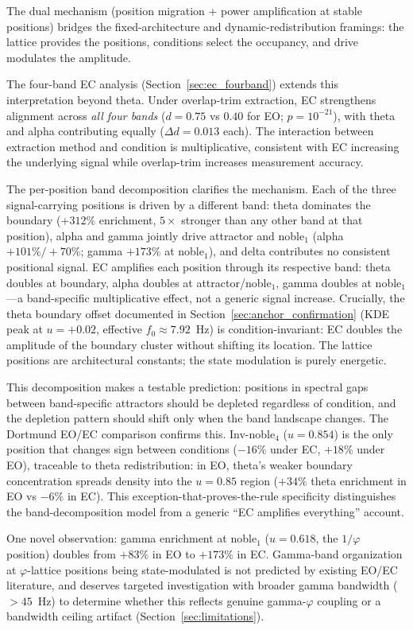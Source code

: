 \documentclass[11pt,a4paper]{article}
\newcommand{\fzero}{f_0}
\begin{document}
The dual mechanism (position migration + power amplification at stable positions) bridges the fixed-architecture and dynamic-redistribution framings: the lattice provides the positions, conditions select the occupancy, and drive modulates the amplitude.

The four-band EC analysis (Section~\ref{sec:ec_fourband}) extends this interpretation beyond theta. Under overlap-trim extraction, EC strengthens alignment across \textit{all four bands} ($d = 0.75$ vs $0.40$ for EO; $p = 10^{-21}$), with theta and alpha contributing equally ($\Delta d = 0.013$ each). The interaction between extraction method and condition is multiplicative, consistent with EC increasing the underlying signal while overlap-trim increases measurement accuracy.

The per-position band decomposition clarifies the mechanism. Each of the three signal-carrying positions is driven by a different band: theta dominates the boundary ($+312\%$ enrichment, $5{\times}$ stronger than any other band at that position), alpha and gamma jointly drive attractor and noble$_1$ (alpha $+101\%/+70\%$; gamma $+173\%$ at noble$_1$), and delta contributes no consistent positional signal. EC amplifies each position through its respective band: theta doubles at boundary, alpha doubles at attractor/noble$_1$, gamma doubles at noble$_1$---a band-specific multiplicative effect, not a generic signal increase. Crucially, the theta boundary offset documented in Section~\ref{sec:anchor_confirmation} (KDE peak at $u = +0.02$, effective $\fzero \approx 7.92$~Hz) is condition-invariant: EC doubles the amplitude of the boundary cluster without shifting its location. The lattice positions are architectural constants; the state modulation is purely energetic.

This decomposition makes a testable prediction: positions in spectral gaps between band-specific attractors should be depleted regardless of condition, and the depletion pattern should shift only when the band landscape changes. The Dortmund EO/EC comparison confirms this. Inv-noble$_4$ ($u = 0.854$) is the only position that changes sign between conditions ($-16\%$ under EC, $+18\%$ under EO), traceable to theta redistribution: in EO, theta's weaker boundary concentration spreads density into the $u = 0.85$ region ($+34\%$ theta enrichment in EO vs $-6\%$ in EC). This exception-that-proves-the-rule specificity distinguishes the band-decomposition model from a generic ``EC amplifies everything'' account.

One novel observation: gamma enrichment at noble$_1$ ($u = 0.618$, the $1/\varphi$ position) doubles from $+83\%$ in EO to $+173\%$ in EC. Gamma-band organization at $\varphi$-lattice positions being state-modulated is not predicted by existing EO/EC literature, and deserves targeted investigation with broader gamma bandwidth ($>45$~Hz) to determine whether this reflects genuine gamma-$\varphi$ coupling or a bandwidth ceiling artifact (Section~\ref{sec:limitations}).
\end{document}
